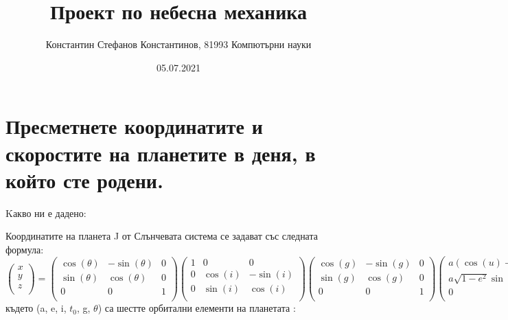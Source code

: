 \documentclass{article}
\title{Проект по небесна механика}
\author{Константин Стефанов Константинов, 81993 Компютърни науки}
\date{05.07.2021}
\begin{document}
\maketitle


\section{Пресметнете координатите и скоростите на планетите в деня, в който сте родени.}


\noindent Kакво ни е дадено:

\noindent Координатите на планета J от Слънчевата система се задават със следната формула: 
\begin{equation}
\begin{pmatrix}
x \\
y \\
z \\
\end{pmatrix} = 
\begin{pmatrix}
\cos(\theta) & -\sin(\theta) & 0 \\
\sin(\theta) & \cos(\theta) & 0 \\
0  & 0  & 1  \\
\end{pmatrix}
\begin{pmatrix}
1 & 0 & 0 \\
0 & \cos(i) & -\sin(i) \\
0  & \sin(i)  & \cos(i)  \\
\end{pmatrix}
\begin{pmatrix}
\cos(g) & -\sin(g) & 0 \\
\sin(g) & \cos(g) & 0 \\
0  & 0  & 1  \\
\end{pmatrix}
\begin{pmatrix}
a(\cos(u) - e)\\
a\sqrt{1-e^2} \sin(u)\\
0\\
\end{pmatrix}
\end{equation}
където (a, e, i, $t_0$, g, $ \theta $) са шестте орбитални елементи на планетата :
\end{document}
